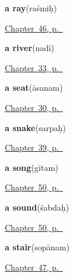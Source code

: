 \noindent\begin{minipage}[t]{\linewidth}
\raggedright
\textbf{a ray}\enspace\emph{}\enspace(raśmiḥ)\par
\footnotesize \hyperref[ch:sa-sun-and-shade]{Chapter~46, p.~\pageref*{ch:sa-sun-and-shade}}
\end{minipage}\par\smallskip

\noindent\begin{minipage}[t]{\linewidth}
\raggedright
\textbf{a river}\enspace\emph{}\enspace(nadī)\par
\footnotesize \hyperref[ch:sa-land]{Chapter~33, p.~\pageref*{ch:sa-land}}
\end{minipage}\par\smallskip

\noindent\begin{minipage}[t]{\linewidth}
\raggedright
\textbf{a seat}\enspace\emph{}\enspace(āsanam)\par
\footnotesize \hyperref[ch:sa-welcome]{Chapter~30, p.~\pageref*{ch:sa-welcome}}
\end{minipage}\par\smallskip

\noindent\begin{minipage}[t]{\linewidth}
\raggedright
\textbf{a snake}\enspace\emph{}\enspace(sarpaḥ)\par
\footnotesize \hyperref[ch:sa-animals]{Chapter~39, p.~\pageref*{ch:sa-animals}}
\end{minipage}\par\smallskip

\noindent\begin{minipage}[t]{\linewidth}
\raggedright
\textbf{a song}\enspace\emph{}\enspace(gītam)\par
\footnotesize \hyperref[ch:sa-sound-and-song]{Chapter~50, p.~\pageref*{ch:sa-sound-and-song}}
\end{minipage}\par\smallskip

\noindent\begin{minipage}[t]{\linewidth}
\raggedright
\textbf{a sound}\enspace\emph{}\enspace(śabdaḥ)\par
\footnotesize \hyperref[ch:sa-sound-and-song]{Chapter~50, p.~\pageref*{ch:sa-sound-and-song}}
\end{minipage}\par\smallskip

\noindent\begin{minipage}[t]{\linewidth}
\raggedright
\textbf{a stair}\enspace\emph{}\enspace(sopānam)\par
\footnotesize \hyperref[ch:sa-parts-of-a-house]{Chapter~47, p.~\pageref*{ch:sa-parts-of-a-house}}
\end{minipage}\par\smallskip

